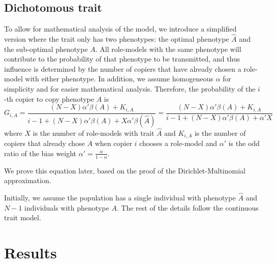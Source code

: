 \documentclass[12pt]{extarticle}
\begin{document}
\subsection*{Dichotomous trait}
To allow for mathematical analysis of the model, we introduce a simplified version where the trait only has two phenotypes: the optimal phenotype $\hat{A}$ and the sub-optimal phenotype $A$. 
All role-models with the same phenotype will contribute to the probability of that phenotype to be transmitted, and thus influence is determined by the number of copiers that have already chosen a role-model with either phenotype.
In addition, we assume homogeneous $\alpha$ for simplicity and for easier mathematical analysis.
Therefore, the probability of the $i$-th copier to copy phenotype $A$ is
\begin{equation}\label{eq:binary-model}
G_{i,A} = \frac{(N-X)\alpha'\beta(A) + K_{i,A}}{i-1 + (N-X)\alpha'\beta(A) + X\alpha'\beta(\hat{A})} = \frac{(N-X)\alpha'\beta(A) + K_{i,A}}{i-1 + (N-X)\alpha'\beta(A) + \alpha'X}
\end{equation}
where $X$ is the number of role-models with trait $\hat{A}$ and $K_{i,A}$ is the number of copiers that already chose $A$ when copier $i$ chooses a role-model and $\alpha'$ is the odd ratio of the bias weight $\alpha'= \frac{\alpha}{1-\alpha}$.

We prove this equation later, based on the proof of the Dirichlet-Multinomial approximation.

Initially, we assume the population has a single individual with phenotype $\hat{A}$ and $N-1$ individuals with phenotype $A$. The rest of the details follow the continuous trait model.

\section*{Results}
\end{document}
